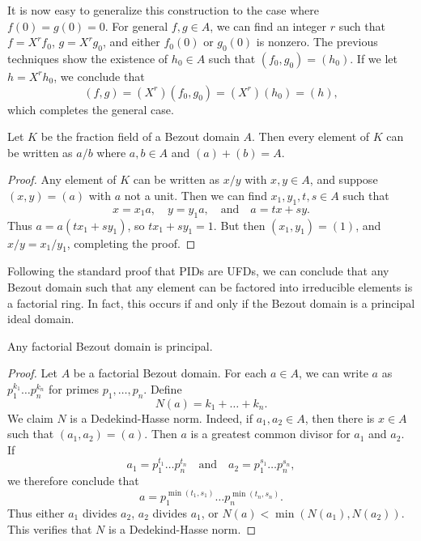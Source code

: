 \begin{example}
    It is now easy to generalize this construction to the case where $f(0) = g(0) = 0$. For general $f,g \in A$, we can find an integer $r$ such that $f = X^r f_0$, $g = X^r g_0$, and either $f_0(0)$ or $g_0(0)$ is nonzero. The previous techniques show the existence of $h_0 \in A$ such that $(f_0,g_0) = (h_0)$. If we let $h = X^r h_0$, we conclude that
    \[ (f,g) = (X^r) (f_0,g_0) = (X^r) (h_0) = (h), \]
    which completes the general case.
\end{example}

\begin{lemma}
    Let $K$ be the fraction field of a Bezout domain $A$. Then every element of $K$ can be written as $a/b$ where $a,b \in A$ and $(a) + (b) = A$.
\end{lemma}
\begin{proof}
    Any element of $K$ can be written as $x/y$ with $x,y \in A$, and suppose $(x,y) = (a)$ with $a$ not a unit. Then we can find $x_1,y_1,t,s \in A$ such that
    \[ x = x_1a,\quad y = y_1a,\quad\text{and}\quad a = tx + sy. \]
    Thus $a = a(tx_1 + sy_1)$, so $tx_1 + sy_1 = 1$. But then $(x_1,y_1) = (1)$, and $x/y=x_1/y_1$, completing the proof.
\end{proof}

Following the standard proof that PIDs are UFDs, we can conclude that any Bezout domain such that any element can be factored into irreducible elements is a factorial ring. In fact, this occurs if and only if the Bezout domain is a principal ideal domain.

\begin{lemma}
    Any factorial Bezout domain is principal.
\end{lemma}
\begin{proof}
    Let $A$ be a factorial Bezout domain. For each $a \in A$, we can write $a$ as $p_1^{k_1} \dots p_n^{k_n}$ for primes $p_1, \dots, p_n$. Define
    \[ N(a) = k_1 + \dots + k_n. \]
    We claim $N$ is a Dedekind-Hasse norm. Indeed, if $a_1,a_2 \in A$, then there is $x \in A$ such that $(a_1,a_2) = (a)$. Then $a$ is a greatest common divisor for $a_1$ and $a_2$. If
    \[ a_1 = p_1^{t_1} \dots p_n^{t_n} \quad\text{and}\quad a_2 = p_1^{s_1} \dots p_n^{s_n}, \]
    we therefore conclude that
    \[ a = p_1^{\min(t_1,s_1)} \dots p_n^{\min(t_n,s_n)}. \]
    Thus either $a_1$ divides $a_2$, $a_2$ divides $a_1$, or $N(a) < \min(N(a_1),N(a_2))$. This verifies that $N$ is a Dedekind-Hasse norm.
\end{proof}


